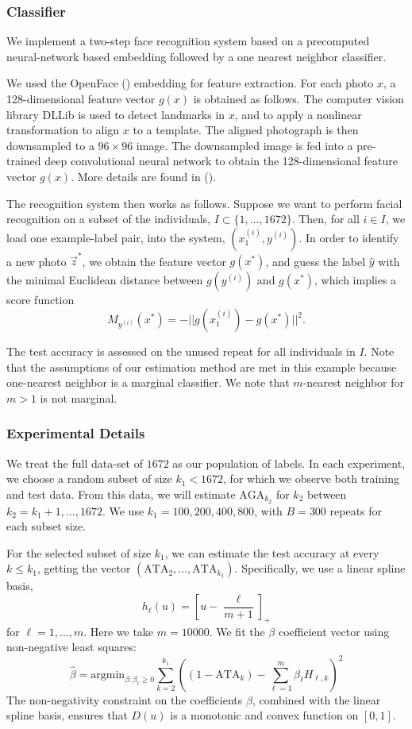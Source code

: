 \documentclass[twoside,11pt]{article}
\newcommand{\argmin}{\text{argmin}}
\begin{document}
\subsubsection*{Classifier}
We implement a two-step face recognition system based on a precomputed neural-network based embedding followed by a one nearest neighbor classifier.

We used the OpenFace (\cite{amos2016openface}) embedding for feature
extraction.  For each photo $x$, a 128-dimensional feature vector
$g(x)$ is obtained as follows.  The computer vision library DLLib is
used to detect landmarks in $x$, and to apply a nonlinear
transformation to align $x$ to a template.  The aligned photograph is
then downsampled to a $96 \times 96$ image. The downsampled image is
fed into a pre-trained deep convolutional neural network to obtain the
128-dimensional feature vector $g(x)$. More details are found in
(\cite{amos2016openface}).

The recognition system then works as follows.  Suppose we want to
perform facial recognition on a subset of the individuals, $I \subset
\{1,\hdots, 1672\}$.  Then, for all $i \in I$, we load one example-label pair, into the system, $(x_1^{(i)}, y^{(i)})$.  In
order to identify a new photo $\vec{z}^*$, we obtain the feature
vector $g(x^*)$, and guess the label $\hat{y}$
with the minimal Euclidean distance between $g(y^{(i)})$ and $g(x^*)$,
which implies a score function
\[
M_{y^{(i)}}(x^*) = -||g(x_1^{(i)}) - g(x^*)||^2.
\]


The test accuracy is assessed on the unused repeat for all individuals
in $I$.  Note that the assumptions of our estimation method are met in
this example because one-nearest neighbor is a marginal classifier.
We note that $m$-nearest neighbor for $m > 1$ is not marginal.

\subsubsection*{Experimental Details}\label{sec:exp_details}
We treat the full data-set of $1672$ as our population of labels. In
each experiment, we choose a random subset of size $k_1<1672$, for
which we observe both training and test data. From this data, we will
estimate $\text{AGA}_{k_2}$ for $k_2$ between $k_2 =
k_1+1,...,1672$. We use $k_1 = 100,200,400,800$, with $B = 300$
repeats for each subset size.

For the selected subset of size $k_1$, we can estimate the test
accuracy at every $k \leq k_1$, getting the vector
$(\text{ATA}_2,...,\text{ATA}_{k_1})$.  Specifically, we use a linear
spline basis,
\[
h_\ell(u) = \left[u - \frac{\ell}{m + 1}\right]_+
\]
for $\ell = 1,\hdots, m$.  Here we take $m = 10000$. 
We fit the $\beta$ coefficient vector using non-negative least squares: 
\[
\hat{\beta} = \argmin_{\beta: \beta_\ell \geq 0} \sum_{k=2}^{k_1} \left( (1 - \text{ATA}_k) - \sum_{\ell=1}^m \beta_\ell H_{\ell, k}\right)^2
\]
The non-negativity constraint on the coefficients $\beta$, combined
with the linear spline basis, ensures that ${D}(u)$ is a monotonic
and convex function on $[0,1]$.
\end{document}
